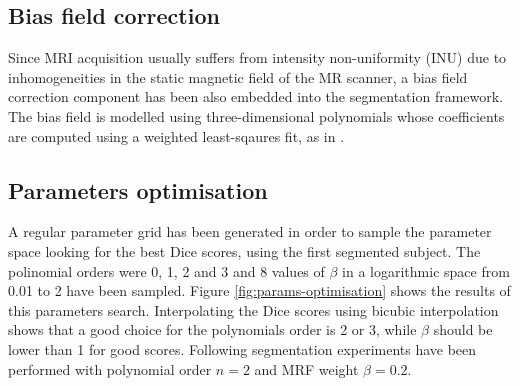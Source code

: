 \subsection{Bias field correction}


Since MRI acquisition usually suffers from intensity non-uniformity (INU) due to inhomogeneities in the static magnetic field of the MR scanner, a bias field correction component has been also embedded into the segmentation framework. The bias field is modelled using three-dimensional polynomials whose coefficients are computed using a weighted least-sqaures fit, as in \cite{leemput_automated_1999}.



\subsection{Parameters optimisation}


A regular parameter grid has been generated in order to sample the parameter space looking for the best Dice scores, using the first segmented subject. The polinomial orders were 0, 1, 2 and 3 and 8 values of $\beta$ in a logarithmic space from 0.01 to 2 have been sampled. Figure \ref{fig:params-optimisation} shows the results of this parameters search. Interpolating the Dice scores using bicubic interpolation shows that a good choice for the polynomials order is 2 or 3, while $\beta$ should be lower than 1 for good scores. Following segmentation experiments have been performed with polynomial order $n = 2$ and MRF weight $\beta = 0.2$.


